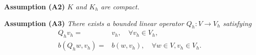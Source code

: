 \documentclass[leqno,CJK]{siamltex704}
\numberwithin{equation}{section}
\begin{document}

	
	\textbf{Assumption (A2)}\emph{ $K$ and $K_h$ are compact.}
	

	
	\textbf{Assumption (A3)}\emph{ There exists a bounded linear operator $Q_h:V\rightarrow V_h$ satisfying
		\begin{align*}
			Q_h v_h =& v_h,\quad\forall v_h\in V_h,
			\\
			b(Q_h w,v_h) =& b(w,v_h),\quad\forall w\in V,v_h\in V_h.
		\end{align*}
	}
	
\end{document}
